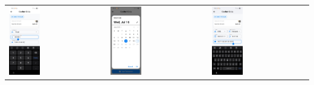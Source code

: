 \begin{tabular}{lll}
    \\
    \includegraphics[width=0.33\textwidth]{images/UI/qris-ta.jpg} &
    \includegraphics[width=0.33\textwidth]{images/UI/qris-td.jpg} &
    \includegraphics[width=0.33\textwidth]{images/UI/qris-tid.jpg} \\
\end{tabular}

